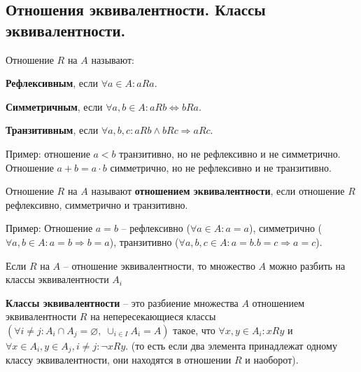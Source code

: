 \subsection{Отношения эквивалентности. Классы эквивалентности.}

Отношение $R$ на $A$ называют:

\textbf{Рефлексивным}, если $\forall a \in A \colon aRa$.

\textbf{Симметричным}, если $\forall a, b \in A \colon aRb \Leftrightarrow bRa$.

\textbf{Транзитивным}, если $\forall a, b, c \colon aRb \wedge bRc \Rightarrow aRc$.

Пример: отношение $a < b$ транзитивно, но не рефлексивно и не симметрично. Отношение $a + b = a \cdot b$ симметрично, но не рефлексивно и не транзитивно.

Отношение $R$ на $A$ называют \textbf{отношением эквивалентности}, если отношение $R$ рефлексивно, симметрично и транзитивно.

Пример: Отношение $a = b$ -- рефлексивно ($\forall a \in A \colon a = a$), симметрично ($\forall a, b \in A \colon a = b \Rightarrow b = a$), транзитивно ($\forall a, b, c \in A \colon a = b. b = c \Rightarrow a = c$).

Если $R$ на $A$ -- отношение эквивалентности, то множество $A$ можно разбить на классы эквивалентности $A_i$

\textbf{Классы эквивалентности} -- это разбиение множества $A$ отношением эквивалентности $R$ на непересекающиеся классы $(\forall i \neq j \colon A_i \cap A_j = \varnothing,\; \cup_{i \in I} A_i = A)$ такое, что $\forall x, y \in A_i \colon xRy$ и $\forall x \in A_i, y \in A_j, i \neq j: \neg xRy$. (то есть если два элемента принадлежат одному классу эквивалентности, они находятся в отношении $R$ и наоборот).
